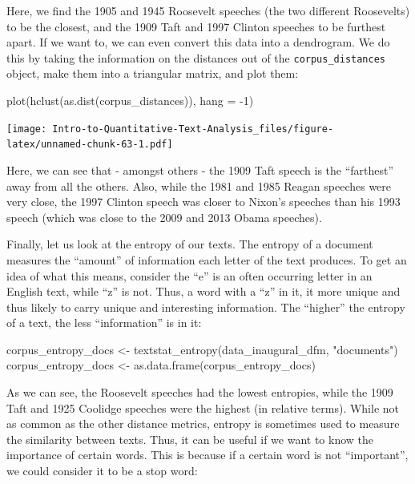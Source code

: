 \documentclass[
]{article}
\newenvironment{Shaded}{\begin{snugshade}}{\end{snugshade}}
\newcommand{\AttributeTok}[1]{\textcolor[rgb]{0.77,0.63,0.00}{#1}}
\newcommand{\DecValTok}[1]{\textcolor[rgb]{0.00,0.00,0.81}{#1}}
\newcommand{\FunctionTok}[1]{\textcolor[rgb]{0.00,0.00,0.00}{#1}}
\newcommand{\NormalTok}[1]{#1}
\newcommand{\OtherTok}[1]{\textcolor[rgb]{0.56,0.35,0.01}{#1}}
\newcommand{\SpecialCharTok}[1]{\textcolor[rgb]{0.00,0.00,0.00}{#1}}
\newcommand{\StringTok}[1]{\textcolor[rgb]{0.31,0.60,0.02}{#1}}
\begin{document}
Here, we find the 1905 and 1945 Roosevelt speeches (the two different Roosevelts) to be the closest, and the 1909 Taft and 1997 Clinton speeches to be furthest apart. If we want to, we can even convert this data into a dendrogram. We do this by taking the information on the distances out of the \texttt{corpus\_distances} object, make them into a triangular matrix, and plot them:

\begin{Shaded}
\begin{Highlighting}[]
\FunctionTok{plot}\NormalTok{(}\FunctionTok{hclust}\NormalTok{(}\FunctionTok{as.dist}\NormalTok{(corpus\_distances)), }\AttributeTok{hang =} \SpecialCharTok{{-}}\DecValTok{1}\NormalTok{)}
\end{Highlighting}
\end{Shaded}

\texttt{[image: Intro-to-Quantitative-Text-Analysis\_files/figure-latex/unnamed-chunk-63-1.pdf]}

Here, we can see that - amongst others - the 1909 Taft speech is the ``farthest'' away from all the others. Also, while the 1981 and 1985 Reagan speeches were very close, the 1997 Clinton speech was closer to Nixon's speeches than his 1993 speech (which was close to the 2009 and 2013 Obama speeches).

Finally, let us look at the entropy of our texts. The entropy of a document measures the ``amount'' of information each letter of the text produces. To get an idea of what this means, consider the ``e'' is an often occurring letter in an English text, while ``z'' is not. Thus, a word with a ``z'' in it, it more unique and thus likely to carry unique and interesting information. The ``higher'' the entropy of a text, the less ``information'' is in it:

\begin{Shaded}
\begin{Highlighting}[]
\NormalTok{corpus\_entropy\_docs }\OtherTok{\textless{}{-}} \FunctionTok{textstat\_entropy}\NormalTok{(data\_inaugural\_dfm, }\StringTok{"documents"}\NormalTok{)}
\NormalTok{corpus\_entropy\_docs }\OtherTok{\textless{}{-}} \FunctionTok{as.data.frame}\NormalTok{(corpus\_entropy\_docs)}
\end{Highlighting}
\end{Shaded}

As we can see, the Roosevelt speeches had the lowest entropies, while the 1909 Taft and 1925 Coolidge speeches were the highest (in relative terms). While not as common as the other distance metrics, entropy is sometimes used to measure the similarity between texts. Thus, it can be useful if we want to know the importance of certain words. This is because if a certain word is not ``important'', we could consider it to be a stop word:
\end{document}
